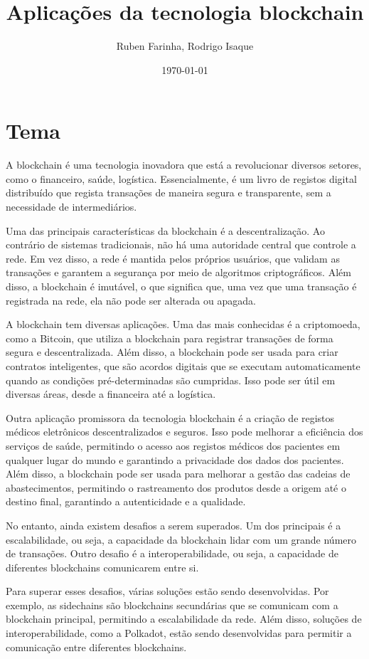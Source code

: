 \documentclass{article}
\title{Aplicações da tecnologia blockchain}
\author{Ruben Farinha, Rodrigo Isaque}
\date{\today}
\begin{document}
\maketitle

\section{Tema}
A blockchain é uma tecnologia inovadora que está a revolucionar diversos setores, como o financeiro, saúde, logística. Essencialmente, é um livro de registos digital distribuído que regista transações de maneira segura e transparente, sem a necessidade de intermediários.

Uma das principais características da blockchain é a descentralização. Ao contrário de sistemas tradicionais, não há uma autoridade central que controle a rede. Em vez disso, a rede é mantida pelos próprios usuários, que validam as transações e garantem a segurança por meio de algoritmos criptográficos. Além disso, a blockchain é imutável, o que significa que, uma vez que uma transação é registrada na rede, ela não pode ser alterada ou apagada.

A blockchain tem diversas aplicações. Uma das mais conhecidas é a criptomoeda, como a Bitcoin, que utiliza a blockchain para registrar transações de forma segura e descentralizada. Além disso, a blockchain pode ser usada para criar contratos inteligentes, que são acordos digitais que se executam automaticamente quando as condições pré-determinadas são cumpridas. Isso pode ser útil em diversas áreas, desde a financeira até a logística.

Outra aplicação promissora da tecnologia blockchain é a criação de registos médicos eletrônicos descentralizados e seguros. Isso pode melhorar a eficiência dos serviços de saúde, permitindo o acesso aos registos médicos dos pacientes em qualquer lugar do mundo e garantindo a privacidade dos dados dos pacientes. Além disso, a blockchain pode ser usada para melhorar a gestão das cadeias de abastecimentos, permitindo o rastreamento dos produtos desde a origem até o destino final, garantindo a autenticidade e a qualidade.

No entanto, ainda existem desafios a serem superados. Um dos principais é a escalabilidade, ou seja, a capacidade da blockchain lidar com um grande número de transações. Outro desafio é a interoperabilidade, ou seja, a capacidade de diferentes blockchains comunicarem entre si.

Para superar esses desafios, várias soluções estão sendo desenvolvidas. Por exemplo, as sidechains são blockchains secundárias que se comunicam com a blockchain principal, permitindo a escalabilidade da rede. Além disso, soluções de interoperabilidade, como a Polkadot, estão sendo desenvolvidas para permitir a comunicação entre diferentes blockchains.
\end{document}
